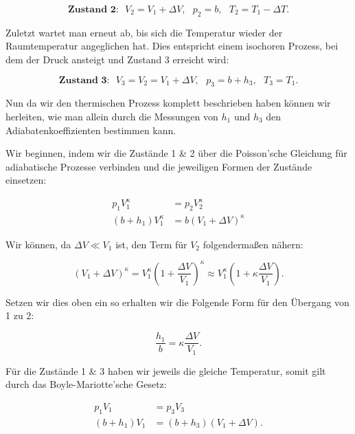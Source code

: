 \documentclass{article}
\begin{document}
\begin{equation}
    \textbf{Zustand 2:} \ \ \ V_2 = V_1 + \Delta V, \ \ \ p_2 = b, \ \ \ T_2 = T_1 - \Delta T.
\end{equation}

Zuletzt wartet man erneut ab, bis sich die Temperatur wieder der Raumtemperatur angeglichen hat. Dies entspricht einem isochoren Prozess, bei dem der Druck ansteigt und Zustand 3 erreicht wird:

\begin{equation}
    \textbf{Zustand 3:} \ \ \ V_3 = V_2 = V_1 + \Delta V, \ \ \ p_3 = b + h_3, \ \ \ T_3 = T_1.
\end{equation}

Nun da wir den thermischen Prozess komplett beschrieben haben können wir herleiten, wie man allein durch die Messungen von $h_1$ und $h_3$ den Adiabatenkoeffizienten bestimmen kann.

Wir beginnen, indem wir die Zustände 1 \& 2 über die Poisson'sche Gleichung für adiabatische Prozesse verbinden und die jeweiligen Formen der Zustände einsetzen:

\begin{equation}
    \begin{split}
        p_1 V_1^\kappa &= p_2 V_2^\kappa \\
        (b + h_1) V_1^\kappa &= b (V_1 + \Delta V)^\kappa
    \end{split}
\end{equation}

Wir können, da $\Delta V \ll V_1$ ist, den Term für $V_2$ folgendermaßen nähern:

\begin{equation}
    (V_1 + \Delta V)^\kappa = V_1^\kappa \left( 1 + \frac{\Delta V}{V_1} \right)^\kappa \approx V_1^\kappa \left( 1 + \kappa \frac{\Delta V}{V_1} \right).
\end{equation}

Setzen wir dies oben ein so erhalten wir die Folgende Form für den Übergang von 1 zu 2:

\begin{equation}
    \frac{h_1}{b} = \kappa \frac{\Delta V}{V_1}.
    \label{eq:12}
\end{equation}

Für die Zustände 1 \& 3 haben wir jeweils die gleiche Temperatur, somit gilt durch das Boyle-Mariotte'sche Gesetz:

\begin{equation}
    \begin{split}
        p_1 V_1 &= p_3 V_3 \\
        (b + h_1) V_1 &= (b + h_3) (V_1 + \Delta V).
    \end{split}
\end{equation}
\end{document}
